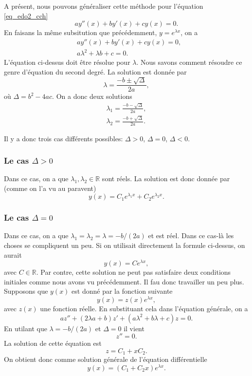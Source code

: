 \documentclass[a4paper,12pt]{book}
\newcommand{\real}{\mathbb{R}}
\begin{document}
A présent, nous pouvons généraliser cette méthode pour l'équation \eqref{eq_edo2_cch}
\begin{equation}
 a y''(x)+by'(x)+cy(x)=0.
\end{equation}
En faisans la même subsitution que précédemment, $y=e^{\lambda x}$, on a
\begin{align}
 &a y''(x)+by'(x)+cy(x)=0,\\
 &a \lambda^2+\lambda b+c=0.
\end{align}
L'équation ci-dessus doit être résolue pour $\lambda$. Nous savons comment résoudre 
ce genre d'équation du second degré. La solution est donnée par
\begin{equation}
 \lambda=\frac{-b\pm\sqrt{\Delta}}{2a},
\end{equation}
où $\Delta = b^2-4ac$. On a donc deux solutions
\begin{align}
 \lambda_1=\frac{-b-\sqrt{\Delta}}{2a},\\
 \lambda_2=\frac{-b+\sqrt{\Delta}}{2a}.
\end{align}

Il y a donc trois cas différents possibles: $\Delta > 0$, $\Delta = 0$, $\Delta < 0$.
\subsubsection{Le cas $\Delta>0$}
Dans ce cas, on a que $\lambda_1,\lambda_2\in\real$ sont réels. 
La solution est donc donnée par (comme on l'a vu au paravent)
\begin{equation}
y(x)=C_1e^{\lambda_1 x}+C_2e^{\lambda_2 x}.
\end{equation} 
\subsubsection{Le cas $\Delta=0$}
Dans ce cas, on a que $\lambda_1=\lambda_2=\lambda=-b/(2a)$ et est réel. Dans ce cas-là
les choses se compliquent un peu. Si on utilisait directement la formule ci-dessus,
on aurait
\begin{equation*}
y(x)=Ce^{\lambda x},
\end{equation*} 
avec $C\in\real$. Par contre, cette solution ne peut pas satisfaire 
deux conditions initiales comme nous avons vu précédemment. Il fau donc 
travailler un peu plus. Supposons que $y(x)$ est donné par la fonction suivante
\begin{equation}
y(x)=z(x)e^{\lambda x},
\end{equation} 
avec $z(x)$ une fonction réelle. En substituant cela dans l'équation générale, on a
\begin{equation}
az''+(2\lambda a+b)z'+(a\lambda^2+b\lambda+c)z=0.
\end{equation} 
En utilant que $\lambda=-b/(2a)$ et $\Delta =0$ il vient
\begin{equation}
z''=0.
\end{equation} 
La solution de cette équation est
\begin{equation}
z=C_1+xC_2.
\end{equation} 
On obtient donc comme solution générale de l'équation différentielle
\begin{equation}
y(x)=(C_1+C_2 x)e^{\lambda x}.
\end{equation} 
\end{document}
